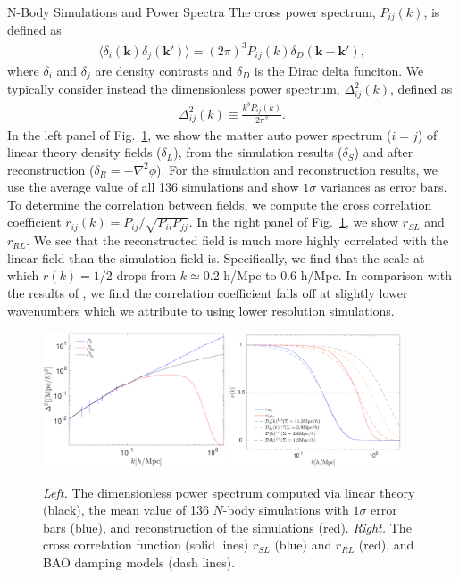 \begin{section}{N-Body Simulations and Power Spectra}
 The cross power spectrum, $P_{ij}(k)$, is defined as
 \begin{align}
   \langle \delta_i(\bm{k})\delta_j(\bm{k'}) \rangle =
   (2\pi)^3 P_{ij}(k) \delta_D(\bm{k}-\bm{k'}),
 \end{align}
 where $\delta_{i}$ and $\delta_j$ are density contrasts and
 $\delta_D$ is the Dirac delta funciton. We typically consider instead
 the dimensionless power spectrum, $\Delta_{ij}^2(k)$, defined as
 \begin{align}
   \Delta_{ij}^2(k) \equiv \frac{k^3 P_{ij}(k)}{2\pi ^2}.
 \end{align}
 In the left panel of Fig.~\ref{fig:cp}, we show the matter auto power
 spectrum ($i=j$) of linear theory density fields ($\delta_L$), from
 the simulation results ($\delta_S$) and after reconstruction
 ($\delta_R=-\nabla^2\phi$).  For the simulation and reconstruction
 results, we use the average value of all 136 simulations and show
 $1\sigma$ variances as error bars.  To determine the correlation
 between fields, we compute the cross correlation coefficient
 $r_{ij}(k) = P_{ij}/\sqrt{P_{ii}P_{jj}}$.  In the right panel of
 Fig.~\ref{fig:cp}, we show $r_{SL}$ and $r_{RL}$.  We see that the
 reconstructed field is much more highly correlated with the linear
 field than the simulation field is.  Specifically, we find that the
 scale at which $r(k)=1/2$ drops from $k\simeq 0.2$ h/Mpc to
 $0.6$ h/Mpc.  In comparison with the results of \citet{bib:ZhuH2016},
 we find the correlation coefficient falls off at slightly lower
 wavenumbers which we attribute to using lower resolution simulations.

  \begin{figure}
    \centering
    \includegraphics[width=0.48\textwidth]{fig2b.pdf}
    \includegraphics[width=0.455\textwidth]{fig2a.pdf}
    \caption{{\it Left.} The dimensionless power spectrum computed via
      linear theory (black), the mean value of 136 $N$-body
      simulations with $1\sigma$ error bars (blue), and reconstruction
      of the simulations (red).  {\it Right.} The cross correlation
      function (solid lines) $r_{SL}$ (blue) and
      $r_{RL}$ (red), and BAO damping models (dash
      lines).}
    \label{fig:cp}
  \end{figure}



\end{section}
